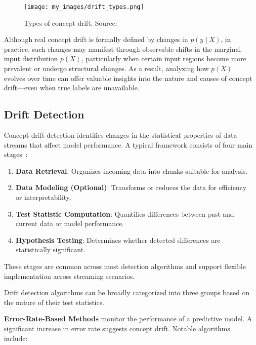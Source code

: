 \begin{figure}[h]
    \centering
    \texttt{[image: my\_images/drift\_types.png]}
    \caption{Types of concept drift. Source:~\cite{drift_adaptation_survey}}\label{fig:concept_drift_types}
\end{figure}

Although real concept drift is formally defined by changes in $p(y \mid X)$, in
practice, such changes may manifest through observable shifts in the marginal
input distribution $p(X)$, particularly when certain input regions become more
prevalent or undergo structural changes. As a result, analyzing how $p(X)$
evolves over time can offer valuable insights into the nature and causes of
concept drift—even when true labels are unavailable.

\subsection*{Drift Detection}\label{subsec:drift_detection}
Concept drift detection identifies changes in the statistical properties of
data streams that affect model performance. A typical framework consists of
four main stages~\cite{learning_under_concept_drift}:

\begin{enumerate}
    \item \textbf{Data Retrieval}: Organizes incoming data into chunks
          suitable for analysis.
    \item \textbf{Data Modeling (Optional)}: Transforms or reduces the data
          for efficiency or interpretability.
    \item \textbf{Test Statistic Computation}: Quantifies differences between
          past and current data or model performance.
    \item \textbf{Hypothesis Testing}: Determines whether detected differences
          are statistically significant.
\end{enumerate}

These stages are common across most detection algorithms and support flexible
implementation across streaming scenarios.

Drift detection algorithms can be broadly categorized into three groups based
on the nature of their test statistics.

\textbf{Error-Rate-Based Methods} monitor the performance of a predictive model.
A significant increase in error rate suggests concept drift.
Notable algorithms include:

